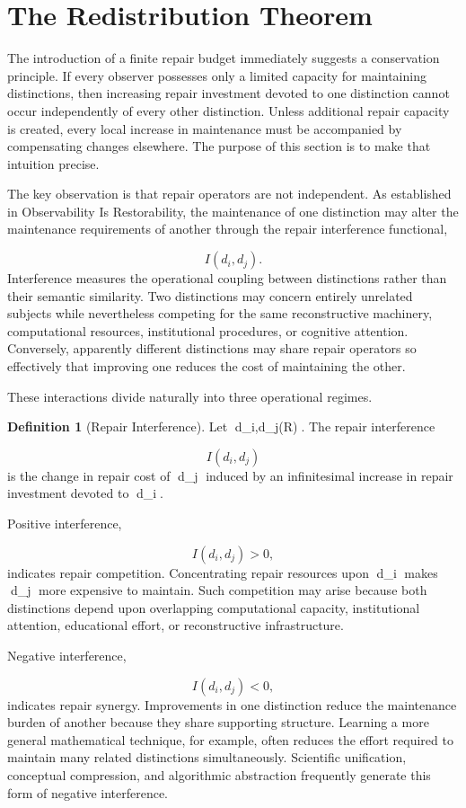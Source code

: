 \documentclass[12pt,oneside]{article}
\theoremstyle{plain}
\theoremstyle{definition}
\newtheorem{definition}[theorem]{Definition}
\theoremstyle{remark}
\DeclareMathOperator{\Rest}{Rest}
\begin{document}
\section{The Redistribution Theorem} 

The introduction of a finite repair budget immediately suggests a conservation principle. If every observer possesses only a limited capacity for maintaining distinctions, then increasing repair investment devoted to one distinction cannot occur independently of every other distinction. Unless additional repair capacity is created, every local increase in maintenance must be accompanied by compensating changes elsewhere. The purpose of this section is to make that intuition precise.

The key observation is that repair operators are not independent. As established in Observability Is Restorability, the maintenance of one distinction may alter the maintenance requirements of another through the repair interference functional,

\[
I(d_i,d_j).
\]
Interference measures the operational coupling between distinctions rather than their semantic similarity. Two distinctions may concern entirely unrelated subjects while nevertheless competing for the same reconstructive machinery, computational resources, institutional procedures, or cognitive attention. Conversely, apparently different distinctions may share repair operators so effectively that improving one reduces the cost of maintaining the other.

These interactions divide naturally into three operational regimes.

\begin{definition}[Repair Interference]
Let d_i,d_j\in\Rest(\mathcal R). The repair interference

\[
I(d_i,d_j)
\]
is the change in repair cost of d_j induced by an infinitesimal increase in repair investment devoted to d_i.
\end{definition}

Positive interference,

\[
I(d_i,d_j)>0,
\]
indicates repair competition. Concentrating repair resources upon d_i makes d_j more expensive to maintain. Such competition may arise because both distinctions depend upon overlapping computational capacity, institutional attention, educational effort, or reconstructive infrastructure.

Negative interference,

\[
I(d_i,d_j)<0,
\]
indicates repair synergy. Improvements in one distinction reduce the maintenance burden of another because they share supporting structure. Learning a more general mathematical technique, for example, often reduces the effort required to maintain many related distinctions simultaneously. Scientific unification, conceptual compression, and algorithmic abstraction frequently generate this form of negative interference.
\end{document}
